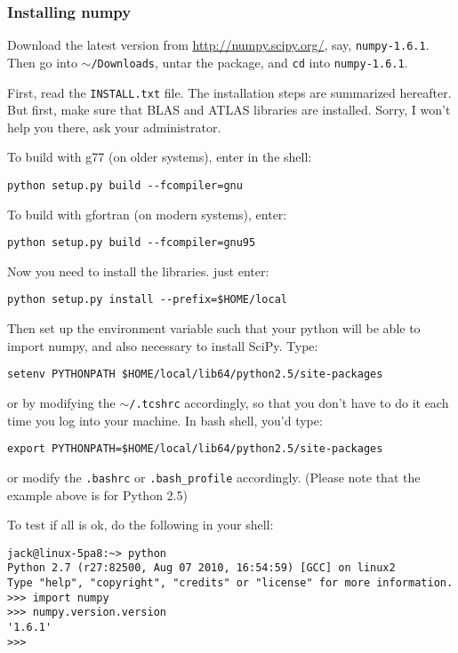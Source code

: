 \documentclass[a4paper,10pt]{book}
\begin{document}
\subsubsection{Installing numpy}
%
\par
Download the latest version from \url{http://numpy.scipy.org/}, say, \texttt{numpy-1.6.1}. Then go into \texttt{$\sim$/Downloads}, untar the package, and \texttt{cd} into \texttt{numpy-1.6.1}.
%
\par
First, read the \texttt{INSTALL.txt} file. The installation steps are summarized hereafter. But first, make sure that BLAS and ATLAS libraries are installed. Sorry, I won't help you there, ask your administrator.
%
\par
To build with g77 (on older systems), enter in the shell:
\begin{verbatim}
python setup.py build --fcompiler=gnu
\end{verbatim}
%
\par
To build with gfortran (on modern systems), enter:
\begin{verbatim}
python setup.py build --fcompiler=gnu95
\end{verbatim}
%
\par
Now you need to install the libraries. just enter:
\begin{verbatim}
python setup.py install --prefix=$HOME/local
\end{verbatim}
%
\par
Then set up the environment variable such that your python will be able to import numpy, and also necessary to install SciPy. Type: 
\begin{verbatim}
setenv PYTHONPATH $HOME/local/lib64/python2.5/site-packages
\end{verbatim}
or by modifying the \texttt{$\sim$/.tcshrc} accordingly, so that you don't have to do it each time you log into your machine. In bash shell, you'd type:
\begin{verbatim}
export PYTHONPATH=$HOME/local/lib64/python2.5/site-packages
\end{verbatim}
or modify the \texttt{.bashrc} or \texttt{.bash\_profile} accordingly. (Please note that the example above is for Python 2.5)
%
\par
To test if all is ok, do the following in your shell:
\begin{verbatim}
jack@linux-5pa8:~> python
Python 2.7 (r27:82500, Aug 07 2010, 16:54:59) [GCC] on linux2
Type "help", "copyright", "credits" or "license" for more information.
>>> import numpy
>>> numpy.version.version
'1.6.1'
>>> 
\end{verbatim}
\end{document}
